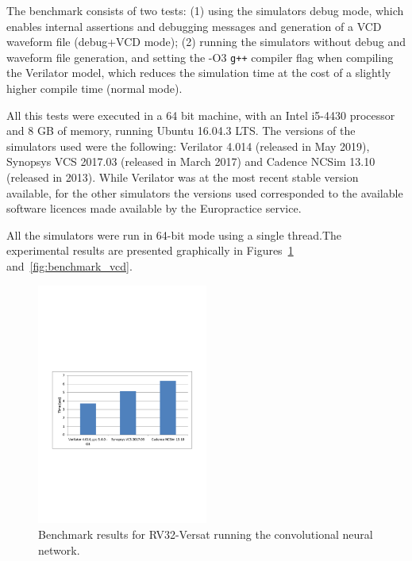 \documentclass[conference]{IEEEtran}
\begin{document}
The benchmark consists of two tests: (1) using the simulators debug mode, which
enables internal assertions and debugging messages and generation of a \ac{VCD}
waveform file (debug+\ac{VCD} mode); (2) running the simulators without debug and
waveform file generation, and setting the -O3 {\tt g++} compiler flag when
compiling the Verilator model, which reduces the simulation time at the cost of
a slightly higher compile time (normal mode).

All this tests were executed in a 64 bit machine, with an Intel i5-4430 processor and 8 
GB of memory, running Ubuntu 16.04.3 LTS. The versions of the simulators used were the 
following: Verilator 4.014 (released in May 2019), Synopsys VCS 2017.03 (released in 
March 2017) and Cadence NCSim 13.10 (released in 2013). While
Verilator was at the most recent stable version available, for the other
simulators the versions used corresponded to the available software licences
made available by the Europractice service.

All the simulators were run in 64-bit mode using a single thread.The experimental results 
are presented graphically in Figures~\ref{fig:benchmark} and~\ref{fig:benchmark_vcd}.

\begin{figure}[!htb]
	\centering
	\includegraphics[trim=0 250 0 290 , clip, width=0.5\textwidth]{Figures/benchmark.pdf}
	\caption{Benchmark results for RV32-Versat running the convolutional neural network.}
	\label{fig:benchmark}
\end{figure}
\end{document}
